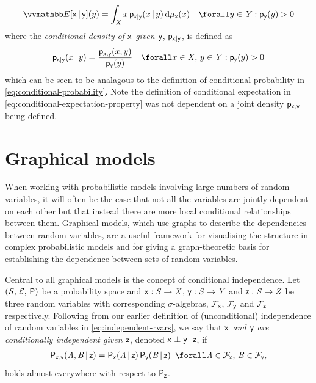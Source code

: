\begin{equation}\label{eq:conditional-expectation-density}
  \expc{\rvar{x}\gvn\rvar{y}}(y) =
  \int_{\set{X}} x\,\pden{\rvar{x}|\rvar{y}}(x\gvn y) \,\dr\mu_{\rvar{x}}(x)
  \quad \forall y \in \set{Y} : \pden{\rvar{y}}(y) > 0
\end{equation}
where the \emph{conditional density of $\mathsf{x}$ given $\mathsf{y}$}, $\mathsf{p}_{\mathsf{x}|\mathsf{y}}$, is defined as
\begin{equation}\label{eq:conditional-density}
  \pden{\rvar{x}|\rvar{y}}(x\gvn y) =
  \frac{\pden{\rvar{x},\rvar{y}}(x,y)}{\pden{\rvar{y}}(y)}
  \quad \forall x \in \set{X},\, y \in \set{Y} : \pden{\rvar{y}}(y) > 0
\end{equation}
which can be seen to be analagous to the definition of conditional probability in \eqref{eq:conditional-probability}. Note the definition of conditional expectation in \eqref{eq:conditional-expectation-property} was not dependent on a joint density $\mathsf{p}_{\mathsf{x},\mathsf{y}}$ being defined.%

\section{Graphical models}\label{sec:graphical-models}

When working with probabilistic models involving large numbers of random variables, it will often be the case that not all the variables are jointly dependent on each other but that instead there are more local conditional relationships between them. Graphical models, which use graphs to describe the dependencies between random variables, are a useful framework for visualising the structure in complex probabilistic models and for giving a graph-theoretic basis for establishing the dependence between sets of random variables.

Central to all graphical models is the concept of conditional independence. Let $(\mathit{S},\,\mathcal{E},\,\mathsf{P})$ be a probability space and $\mathsf{x} : \mathit{S} \to \mathit{X}$, $\mathsf{y} : \mathit{S} \to \mathit{Y}$ and $\mathsf{z} : \mathit{S} \to \mathit{Z}$ be three random variables with corresponding $\sigma$-algebras, $\mathcal{F}_{\mathsf{x}}$, $\mathcal{F}_{\mathsf{y}}$ and $\mathcal{F}_{\mathsf{z}}$ respectively. Following from our earlier definition of (unconditional) independence of random variables in \eqref{eq:independent-rvars}, we say that \emph{$\mathsf{x}$ and $\mathsf{y}$ are conditionally independent given $\mathsf{z}$}, denoted $\mathsf{x} \perp \mathsf{y} \operatorname{|} \mathsf{z}$, if
\begin{equation}\label{eq:conditional-independence-property}
\begin{split}
  \prob{\rvar{x},\rvar{y}}(\set{A},\set{B} \gvn \rvar{z}) =
  \prob{\rvar{x}}(\set{A} \gvn \rvar{z})\,
  \prob{\rvar{y}}(\set{B} \gvn \rvar{z})
  ~\,\forall 
  \set{A} \in \sset{F}_{\rvar{x}},\,
  \set{B} \in \sset{F}_{\rvar{y}},
\end{split}	
\end{equation}
holds almost everywhere with respect to $\mathsf{P}_{\mathsf{z}}$. 

